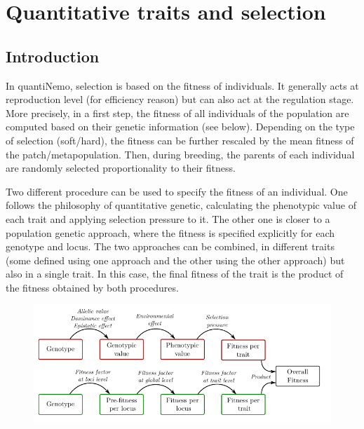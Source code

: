 \documentclass[letterpaper,12pt,oneside]{book}
\begin{document}
\chapter{Quantitative traits and selection}\label{chap:QuantitativeTraitsAndSelection}
\section{Introduction}
In quantiNemo,  selection is based on the fitness of individuals. It generally acts at reproduction level (for efficiency reason) but can also act at the regulation stage. 
More precisely, in a first step, the fitness of all individuals of the population are computed based on their genetic information (see below). Depending on the type of selection (soft/hard), the fitness can be further rescaled by the mean fitness of the patch/metapopulation. Then, during breeding, the parents of each individual are randomly selected proportionality to their fitness.  

Two different procedure can be used to specify the fitness of an individual. One follows the philosophy of quantitative genetic, calculating the phenotypic value of each trait and applying selection pressure to it. The other one is closer to a population genetic approach, where the fitness is specified explicitly for each genotype and locus. The two approaches can be combined, in different traits (some defined using one approach and the other using the other approach) but also in a single trait. In this case, the final fitness of the trait is the product of the fitness obtained by both procedures. 
\begin{figure}[h]
    \centering
        \includegraphics[width=1\textwidth]{selection.pdf}
    \label{fig:Selection}
\end{figure}
\end{document}
